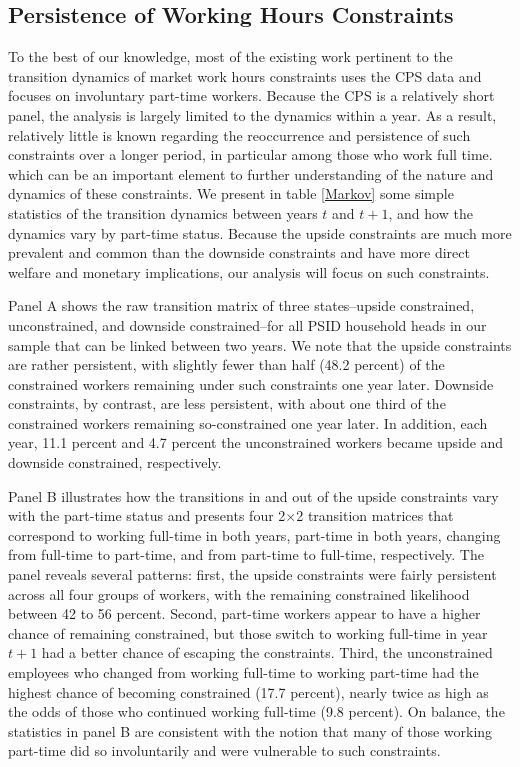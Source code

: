 \subsection{Persistence of Working Hours Constraints}
To the best of our knowledge, most of the existing work pertinent to the transition dynamics of market work hours constraints uses the CPS data and focuses on involuntary part-time workers.  Because the CPS is a relatively short panel, the analysis is largely limited to the dynamics within a year.  As a result, relatively little is known regarding the reoccurrence and persistence of such constraints over a longer period, in particular among those who work full time. which can be an important element to further understanding of the nature and dynamics of these constraints. We present in table \ref{Markov} some simple statistics of the transition dynamics between years $t$ and $t+1$, and how the dynamics vary by part-time status. Because the upside constraints are much more prevalent and common than the downside constraints and have more direct welfare and monetary implications, our analysis will focus on such constraints.

Panel A shows the raw transition matrix of three states--upside constrained, unconstrained, and downside constrained--for all PSID household heads in our sample that can be linked between two years. We note that the upside constraints are rather persistent, with slightly fewer than half (48.2 percent) of the constrained workers remaining under such constraints one year later. Downside constraints, by contrast, are less persistent, with about one third of the constrained workers remaining so-constrained one year later. In addition, each year, 11.1 percent and 4.7 percent the unconstrained workers became upside and downside constrained, respectively.

Panel B illustrates how the transitions in and out of the upside constraints vary with the part-time status and presents four 2$\times$2 transition matrices that correspond to working full-time in both years, part-time in both years, changing from full-time to part-time, and from part-time to full-time, respectively.  The panel reveals several patterns: first, the upside constraints were fairly persistent across all four groups of workers, with the remaining constrained likelihood between 42 to 56 percent. Second, part-time workers appear to have a higher chance of remaining constrained, but those switch to working full-time in year $t+1$ had a better chance of escaping the constraints. Third, the unconstrained employees who changed from working full-time to working part-time had the highest chance of becoming constrained (17.7 percent), nearly twice as high as the odds of those who continued working full-time (9.8 percent). On balance, the statistics in panel B are consistent with the notion that many of those working part-time did so involuntarily and were vulnerable to such constraints.

